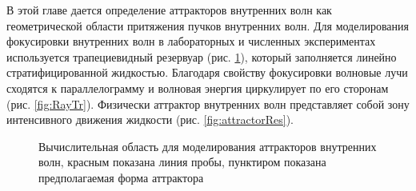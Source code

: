 \documentclass[utf8x]{G7-32} %
\begin{document}
В этой главе дается определение аттракторов внутренних волн как геометрической области притяжения пучков внутренних волн. 
Для моделирования фокусировки внутренних волн в лабораторных и численных экспериментах используется трапециевидный резервуар (рис. \ref{fig:dominleft}), который заполняется линейно стратифицированной жидкостью.  Благодаря свойству фокусировки волновые лучи сходятся к параллелограмму и волновая энергия циркулирует по его сторонам (рис. \ref{fig:RayTr}). Физически аттрактор внутренних волн представляет собой зону интенсивного движения жидкости (рис. \ref{fig:attractorRes}).

\begin{figure}[!ht]
        \centering
          \caption{Вычислительная область для моделирования аттракторов внутренних волн, красным показана линия пробы, пунктиром показана предполагаемая форма аттрактора}
          \label{fig:dominleft}
\end{figure}
\end{document}
